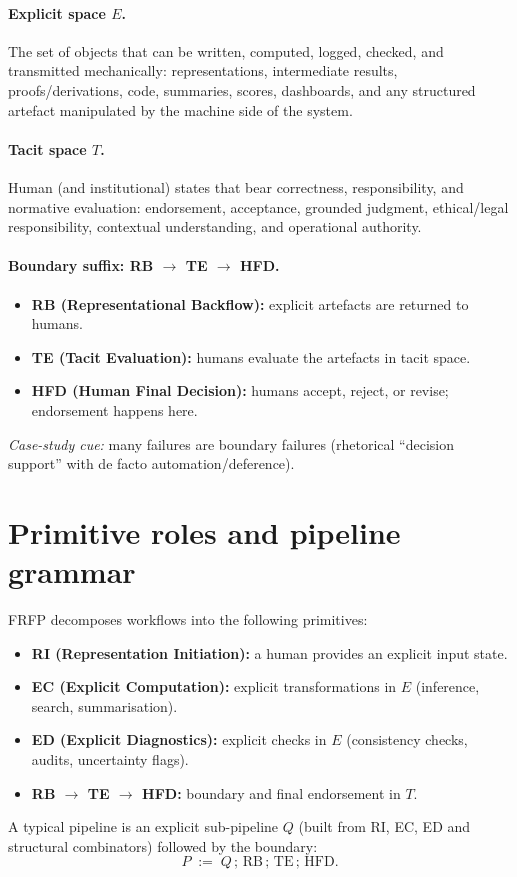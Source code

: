 \paragraph{Explicit space $E$.}
The set of objects that can be written, computed, logged, checked, and transmitted mechanically:
representations, intermediate results, proofs/derivations, code, summaries, scores, dashboards,
and any structured artefact manipulated by the machine side of the system.

\paragraph{Tacit space $T$.}
Human (and institutional) states that bear correctness, responsibility, and normative evaluation:
endorsement, acceptance, grounded judgment, ethical/legal responsibility, contextual understanding,
and operational authority.

\paragraph{Boundary suffix: RB $\to$ TE $\to$ HFD.}
\begin{itemize}
\item \textbf{RB (Representational Backflow):} explicit artefacts are returned to humans.
\item \textbf{TE (Tacit Evaluation):} humans evaluate the artefacts in tacit space.
\item \textbf{HFD (Human Final Decision):} humans accept, reject, or revise; endorsement happens here.
\end{itemize}
\noindent\emph{Case-study cue:} many failures are boundary failures (rhetorical ``decision support'' with
de facto automation/deference).

\section{Primitive roles and pipeline grammar}
\label{sec:lookup-primitives}

FRFP decomposes workflows into the following primitives:
\begin{itemize}
\item \textbf{RI (Representation Initiation):} a human provides an explicit input state.
\item \textbf{EC (Explicit Computation):} explicit transformations in $E$ (inference, search, summarisation).
\item \textbf{ED (Explicit Diagnostics):} explicit checks in $E$ (consistency checks, audits, uncertainty flags).
\item \textbf{RB $\to$ TE $\to$ HFD:} boundary and final endorsement in $T$.
\end{itemize}
A typical pipeline is an explicit sub-pipeline $Q$ (built from RI, EC, ED and structural combinators)
followed by the boundary:
\[
P \;:=\; Q \,;\, \mathrm{RB} \,;\, \mathrm{TE} \,;\, \mathrm{HFD}.
\]

